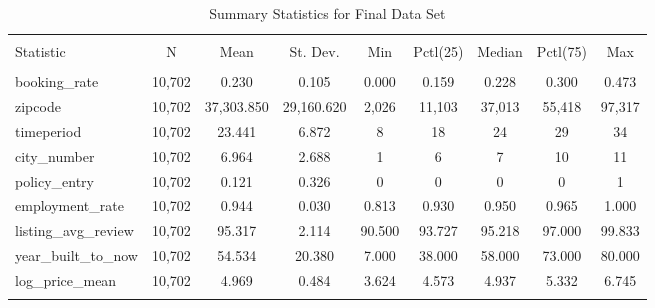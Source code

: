 
\begin{table}[!htbp] \centering 
  \caption{Summary Statistics for Final Data Set} 
  \label{} 
\small 
\begin{tabular}{@{\extracolsep{5pt}}lcccccccc} 
\\[-1.8ex]\hline 
\hline \\[-1.8ex] 
Statistic & \multicolumn{1}{c}{N} & \multicolumn{1}{c}{Mean} & \multicolumn{1}{c}{St. Dev.} & \multicolumn{1}{c}{Min} & \multicolumn{1}{c}{Pctl(25)} & \multicolumn{1}{c}{Median} & \multicolumn{1}{c}{Pctl(75)} & \multicolumn{1}{c}{Max} \\ 
\hline \\[-1.8ex] 
booking\_rate & 10,702 & 0.230 & 0.105 & 0.000 & 0.159 & 0.228 & 0.300 & 0.473 \\ 
zipcode & 10,702 & 37,303.850 & 29,160.620 & 2,026 & 11,103 & 37,013 & 55,418 & 97,317 \\ 
timeperiod & 10,702 & 23.441 & 6.872 & 8 & 18 & 24 & 29 & 34 \\ 
city\_number & 10,702 & 6.964 & 2.688 & 1 & 6 & 7 & 10 & 11 \\ 
policy\_entry & 10,702 & 0.121 & 0.326 & 0 & 0 & 0 & 0 & 1 \\ 
employment\_rate & 10,702 & 0.944 & 0.030 & 0.813 & 0.930 & 0.950 & 0.965 & 1.000 \\ 
listing\_avg\_review & 10,702 & 95.317 & 2.114 & 90.500 & 93.727 & 95.218 & 97.000 & 99.833 \\ 
year\_built\_to\_now & 10,702 & 54.534 & 20.380 & 7.000 & 38.000 & 58.000 & 73.000 & 80.000 \\ 
log\_price\_mean & 10,702 & 4.969 & 0.484 & 3.624 & 4.573 & 4.937 & 5.332 & 6.745 \\ 
\hline \\[-1.8ex] 
\end{tabular} 
\end{table} 
